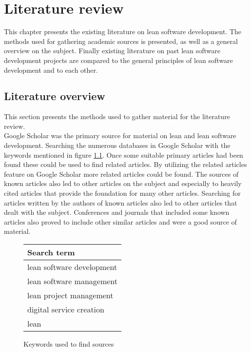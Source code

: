 
\chapter{Literature review}
\label{chapter:litterature}

This chapter presents the existing literature on lean software development. The methods used for gathering academic sources is presented, as well as a general overview on the subject. Finally existing literature on past lean software development projects are compared to the general principles of lean software development and to each other.

\section{Literature overview}
\label{section:litoverview}

This section presents the methods used to gather material for the literature review.\\

Google Scholar was the primary source for material on lean and lean software development. Searching the numerous databases in Google Scholar with the keywords mentioned in figure \ref{figure:keywords}. Once some suitable primary articles had been found these could be used to find related articles. By utilizing the related articles feature on Google Scholar more related articles could be found. The sources of known articles also led to other articles on the subject and especially to heavily cited articles that provide the foundation for many other articles. Searching for articles written by the authors of known articles also led to other articles that dealt with the subject. Conferences and journals that included some known articles also proved to include other similar articles and were a good source of material.

\begin{figure}[h]
  \label{figure:keywords}
  \begin{center}
    \begin{tabular}{| l |}
      \hline
      Search term \\
      \hline
      lean software development \\
      lean software management \\
      lean project management \\
      digital service creation \\
      lean \\
      \hline
     \end{tabular}
    \caption{Keywords used to find sources}
  \end{center}
\end{figure}



